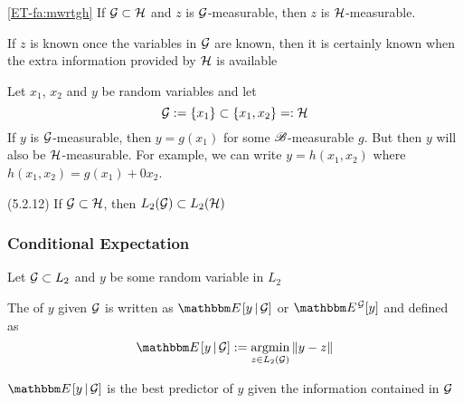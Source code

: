 \begin{frame}

    \vspace{2em}
    \Fact
        \eqref{ET-fa:mwrtgh}
        If $\mathcal G \subset \mathcal H$ and $z$ is $\mathcal G$-measurable, then $z$ is
        $\mathcal H$-measurable.

    If $z$ is known once the variables in $\mathcal G$ are
    known, then it is certainly known when the extra information provided by $\mathcal H$
    is available
\end{frame}

\begin{frame}

    \vspace{2em}
    \Eg
    Let $x_1$, $x_2$ and $y$ be random variables and let 
    \begin{equation*}
         \mathcal G := \{x_1\} \subset \{x_1, x_2\} =: \mathcal H   
    \end{equation*}
    If $y$ is $\mathcal G$-measurable, then $y = g(x_1)$ for some $\mathscr B$-measurable
    $g$.  But then $y$ will also be $\mathcal H$-measurable. For example, we can
    write $y = h(x_1,x_2)$ where $h(x_1,x_2) = g(x_1) + 0 x_2$.

    \vspace{2em}
    \Fact (5.2.12)
    If $\mathcal G \subset \mathcal H$, then $L_2(\mathcal G) \subset L_2(\mathcal H)$
    

\end{frame}

\begin{frame}\frametitle{Conditional Expectation}

    \vspace{2em}
    Let $\mathcal G \subset L_2$ and
    $y$ be some random variable in $L_2$
    
    The  of
    $y$ given $\mathcal G$ is written as $\EE[ y \given \gG]$  or $\EE^{\gG} [y]$ and defined as
    \begin{equation}
        \label{eq:defcd}
        \EE [y \given \gG] := \argmin_{z \in L_2(\gG)} \| y - z \|
    \end{equation}
    
    
    $\EE[y \given \gG]$ is the best
    predictor of $y$ given the information contained in $\mathcal G$
    
    
\end{frame}

